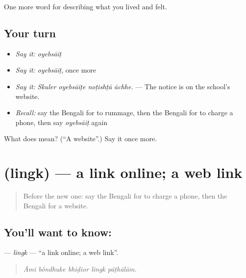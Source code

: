 \begin{grammarlens}[title={What you've built}]
One more word for describing what you lived and felt.
\end{grammarlens}

\subsection*{Your turn}
\begin{itemize}
\raggedright
  \item \emph{Say it:} \emph{oyebsāiṭ}
  \item \emph{Say it:} \emph{oyebsāiṭ}, once more
  \item \emph{Say it:} \emph{Skuler oyebsāiṭe noṭishṭā āchhe.} — The notice is on the school's website.
  \item \emph{Recall:} say the Bengali for to rummage, then the Bengali for to charge a phone, then say \emph{oyebsāiṭ} again
\end{itemize}

\begin{tcolorbox}[breakable,colback=teal!4,colframe=teal!35!black,title={Before you move on}]
What does  mean? (\textquotedblleft{}A website\textquotedblright{}.) Say it once more.
\end{tcolorbox}
\section[\texorpdfstring{\bn{লিংক} (lingk)}{লিংক (lingk)}]{ (lingk) — a link online; a web link}

\label{lesson:BN-C503-lingk}



\begin{quote}
Before the new one: say the Bengali for to charge a phone, then the Bengali for a website.
\end{quote}

\subsection*{You'll want to know: }
\textbf{} — \emph{lingk} — \textquotedblleft{}a link online; a web link\textquotedblright{}.

\begin{quote}
    
\end{quote}

\begin{quote}
\emph{Āmi bôndhuke bhiḍior lingk pāṭhālām.}
\end{quote}

